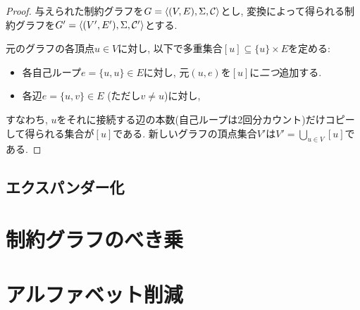 \begin{proof}

与えられた制約グラフを$G=\langle(V,E),\Sigma,\mathcal{C}\rangle$とし, 変換によって得られる制約グラフを$G'=\langle(V',E'),\Sigma,\mathcal{C}'\rangle$とする.

元のグラフの各頂点$u\in V$に対し, 以下で多重集合$[u] \subseteq \{u\}\times E$を定める:
\begin{itemize}
\item 各自己ループ$e=\{u,u\}\in E$に対し, 元$(u,e)$を$[u]$に\emph{二つ}追加する.
\item 各辺$e=\{u,v\}\in E$ (ただし$v\ne u$)に対し, 
\end{itemize}
すなわち, $u$をそれに接続する辺の本数(自己ループは2回分カウント)だけコピーして得られる集合が$[u]$である.
新しいグラフの頂点集合$V'$は$V'=\bigcup_{u\in V} [u]$である.

\end{proof}

\subsection{エクスパンダー化}


\section{制約グラフのべき乗}

\section{アルファベット削減}



